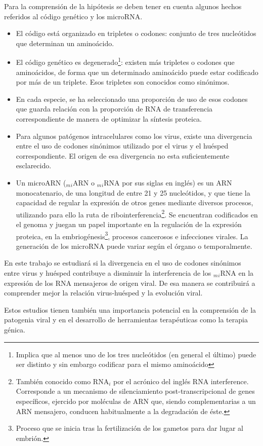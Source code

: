 \documentclass[12pt,a4paper]{article}
\begin{document}
\par Para la comprensión de la hipótesis se deben tener en cuenta algunos hechos referidos al código genético y los microRNA.
\begin{itemize}
	\item El código está organizado en tripletes o codones: conjunto de tres nucleótidos que determinan un aminoácido.
	\item El código genético es degenerado\footnote{Implica que al menos uno de los tres nucleótidos (en general el último) puede ser distinto y sin 				embargo codificar para el mismo aminoácido}: existen más tripletes o codones que aminoácidos, de forma que un determinado aminoácido puede 				estar codificado por más de un triplete. Esos tripletes son conocidos como sinónimos. 
	\item En cada especie, se ha seleccionado una proporción de uso de esos codones que guarda relación con la proporción de RNA de transferencia  				correspondiente de manera de optimizar la síntesis proteica.
	\item Para algunos patógenos intracelulares como los virus, existe una divergencia entre el uso de codones sinónimos utilizado por el virus y el 			huésped	correspondiente. El origen de esa divergencia no esta suficientemente esclarecido.
	\item Un microARN ($_m$$_i$ARN o $_m$$_i$RNA por sus siglas en inglés) es un ARN monocatenario, de una longitud de entre 21 y 25 nucleótidos, y que 				tiene la capacidad de regular la expresión de otros genes mediante diversos procesos, utilizando para ello la ruta de 							ribointerferencia\footnote{También conocido como RNA$_i$ por el acrónico del inglés RNA interference. Corresponde a un mecanismo 							de silenciamiento post-transcripcional de genes específicos, ejercido por moléculas de ARN que, siendo complementarias a un ARN 						mensajero, conducen habitualmente a la degradación de éste.}. Se encuentran codificados en el genoma y juegan un papel importante 							en la regulación de la expresión proteica, en la embriogénesis\footnote{Proceso que se inicia tras la fertilización de los gametos 							para dar lugar al embrión.}, procesos cancerosos e infecciones virales. La generación de los microRNA puede variar según el 						órgano o temporalmente. 
\end{itemize}

\par En este trabajo se estudiará si la divergencia en el uso de codones sinónimos entre virus y huésped contribuye a disminuir la interferencia de los $_m$$_i$RNA en la expresión de los  RNA mensajeros de origen viral. De esa manera se contribuirá a comprender mejor la relación virus-huésped y la evolución viral.
\par Estos estudios tienen también una importancia potencial en la comprensión de la patogenia viral y en el desarrollo de herramientas terapéuticas como la terapia génica.
\end{document}
